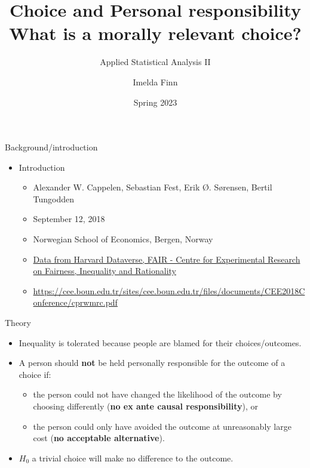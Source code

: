 \documentclass{beamer}
\title{Choice and Personal responsibility\\What is a morally relevant choice?}
\author{Imelda Finn}
\subtitle{Applied Statistical Analysis II}
\date{Spring 2023}
\begin{document}
	\frame{\titlepage}

	\begin{frame}{Background/introduction}

		\begin{block}

			\begin{itemize}

				\item Introduction \vspace{.25cm}
				\begin{itemize}
					\item Alexander W. Cappelen, Sebastian Fest, Erik Ø. Sørensen, Bertil Tungodden
					\item September 12, 2018
					\item Norwegian School of Economics, Bergen, Norway
					\item \href{https://dataverse.harvard.edu/dataset.xhtml?persistentId=doi:10.7910/DVN/A6KFNO}{Data from Harvard Dataverse, FAIR - Centre for Experimental Research on Fairness, Inequality and Rationality}
					\item 					\url{https://cee.boun.edu.tr/sites/cee.boun.edu.tr/files/documents/CEE2018Conference/cprwmrc.pdf} %
				\end{itemize}
			\end{itemize}
		\end{block}
	\end{frame}

	\begin{frame}{Theory}

	\begin{block}

		\begin{itemize}
			\item Inequality is tolerated because people are blamed for their choices/outcomes.
			\item A person should \textbf{not} be held personally responsible for the outcome of a choice if:
			\begin{itemize}
				\item the person could not have changed the likelihood of the outcome by choosing differently 	(\textbf{no ex ante causal responsibility}), or
				\item  the person could only have avoided the outcome at unreasonably large cost (\textbf{no acceptable alternative}).
			\end{itemize}
			\item 	$H_0$ a trivial choice will make no difference to the outcome.
		\end{itemize}
	\end{block}
\end{frame}
\end{document}
